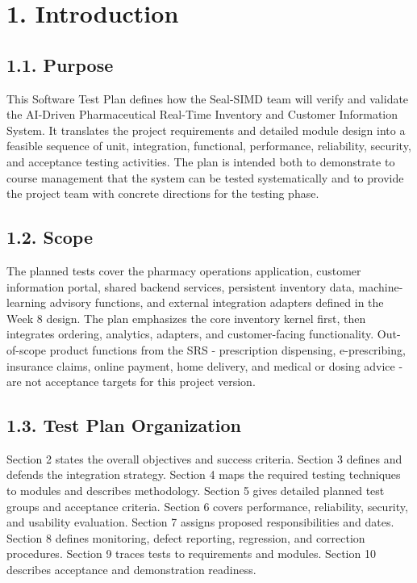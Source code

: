 \clearpage
\tableofcontents

\clearpage
\section{1. Introduction}\label{introduction}

\subsection{1.1. Purpose}\label{purpose}

This Software Test Plan defines how the Seal-SIMD team will verify and validate the AI-Driven Pharmaceutical Real-Time Inventory and Customer Information System. It translates the project requirements and detailed module design into a feasible sequence of unit, integration, functional, performance, reliability, security, and acceptance testing activities. The plan is intended both to demonstrate to course management that the system can be tested systematically and to provide the project team with concrete directions for the testing phase.

\subsection{1.2. Scope}\label{scope}

The planned tests cover the pharmacy operations application, customer information portal, shared backend services, persistent inventory data, machine-learning advisory functions, and external integration adapters defined in the Week 8 design. The plan emphasizes the core inventory kernel first, then integrates ordering, analytics, adapters, and customer-facing functionality. Out-of-scope product functions from the SRS - prescription dispensing, e-prescribing, insurance claims, online payment, home delivery, and medical or dosing advice - are not acceptance targets for this project version.

\subsection{1.3. Test Plan Organization}\label{test-plan-organization}

Section 2 states the overall objectives and success criteria. Section 3 defines and defends the integration strategy. Section 4 maps the required testing techniques to modules and describes methodology. Section 5 gives detailed planned test groups and acceptance criteria. Section 6 covers performance, reliability, security, and usability evaluation. Section 7 assigns proposed responsibilities and dates. Section 8 defines monitoring, defect reporting, regression, and correction procedures. Section 9 traces tests to requirements and modules. Section 10 describes acceptance and demonstration readiness.

